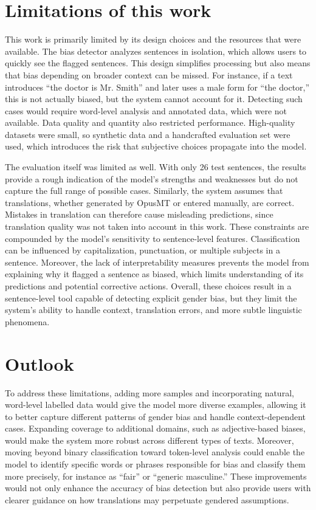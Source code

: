 \section{Limitations of this work}
   This work is primarily limited by its design choices and the resources that were available. The bias detector analyzes sentences in isolation, which allows users to quickly see the flagged sentences. This design simplifies processing but also means that bias depending on broader context can be missed. For instance, if a text introduces “the doctor is Mr. Smith” and later uses a male form for “the doctor,” this is not actually biased, but the system cannot account for it. Detecting such cases would require word-level analysis and annotated data, which were not available. Data quality and quantity also restricted performance. High-quality datasets were small, so synthetic data and a handcrafted evaluation set were used, which introduces the risk that subjective choices propagate into the model.

   The evaluation itself was limited as well. With only 26 test sentences, the results provide a rough indication of the model’s strengths and weaknesses but do not capture the full range of possible cases. Similarly, the system assumes that translations, whether generated by OpusMT or entered manually, are correct. Mistakes in translation can therefore cause misleading predictions, since translation quality was not taken into account in this work. These constraints are compounded by the model's sensitivity to sentence-level features. Classification can be influenced by capitalization, punctuation, or multiple subjects in a sentence. Moreover, the lack of interpretability measures prevents the model from explaining why it flagged a sentence as biased, which limits understanding of its predictions and potential corrective actions. Overall, these choices result in a sentence-level tool capable of detecting explicit gender bias, but they limit the system's ability to handle context, translation errors, and more subtle linguistic phenomena.

\section{Outlook}
   To address these limitations, adding more samples and incorporating natural, word-level labelled data would give the model more diverse examples, allowing it to better capture different patterns of gender bias and handle context-dependent cases. Expanding coverage to additional domains, such as adjective-based biases, would make the system more robust across different types of texts. Moreover, moving beyond binary classification toward token-level analysis could enable the model to identify specific words or phrases responsible for bias and classify them more precisely, for instance as “fair” or “generic masculine.” These improvements would not only enhance the accuracy of bias detection but also provide users with clearer guidance on how translations may perpetuate gendered assumptions.

